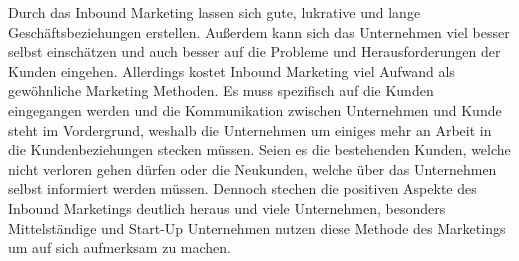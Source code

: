 \newline 
Durch das Inbound Marketing lassen sich gute, lukrative und lange Geschäftsbeziehungen erstellen. Außerdem kann sich das Unternehmen viel besser selbst einschätzen und auch besser auf die Probleme und Herausforderungen der Kunden eingehen. Allerdings kostet Inbound Marketing viel Aufwand als gewöhnliche Marketing Methoden. Es muss spezifisch auf die Kunden eingegangen werden und die Kommunikation zwischen Unternehmen und Kunde steht im Vordergrund, weshalb die Unternehmen um einiges mehr an Arbeit in die Kundenbeziehungen stecken müssen. Seien es die bestehenden Kunden, welche nicht verloren gehen dürfen oder die Neukunden, welche über das Unternehmen selbst informiert werden müssen. Dennoch stechen die positiven Aspekte des Inbound Marketings deutlich heraus und viele Unternehmen, besonders Mittelständige und Start-Up Unternehmen nutzen diese Methode des Marketings um auf sich aufmerksam zu machen.


